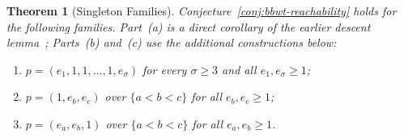 \documentclass[11pt,a4paper]{article}
\newtheorem{theorem}{Theorem}
\theoremstyle{definition}
\begin{document}
\begin{theorem}[Singleton Families]
\label{thm:infinite-families}
Conjecture~\ref{conj:bbwt-reachability} holds for the following families. Part~(a) is a direct corollary of the earlier descent lemma~\cite{BadkobehBannaiIKoppl2026}; Parts~(b) and~(c) use the additional constructions below:
\begin{enumerate}[label=(\alph*),leftmargin=*]
    \item $p = (e_1, 1, 1, \dots, 1, e_\sigma)$ for every $\sigma \ge 3$ and all $e_1, e_\sigma \ge 1$;
    \item $p = (1, e_b, e_c)$ over $\{a < b < c\}$ for all $e_b, e_c \ge 1$;
    \item $p = (e_a, e_b, 1)$ over $\{a < b < c\}$ for all $e_a, e_b \ge 1$.
\end{enumerate}
\end{theorem}
\end{document}
